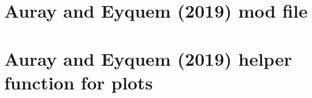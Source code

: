 \documentclass{article}
\begin{document}
\newpage

\appendix
\section{Auray and Eyquem (2019) mod file\label{app:AurayEyquem2019.modfile}}


\section{Auray and Eyquem (2019) helper function for plots\label{app:AurayEyquem2019.plotfile}}

\end{document}
